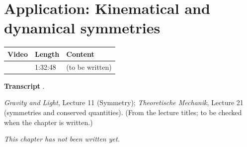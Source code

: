 \chapter{Application: Kinematical and dynamical symmetries}\label{ch:l28}
\begin{paracol}{2}

\begin{sources}
\begin{tabularx}{\linewidth}{@{}l l L@{}}
\toprule
\textbf{Video} & \textbf{Length} & \textbf{Content}\\
\midrule
{} & 1:32:48 & (to be written)\\
\bottomrule
\end{tabularx}

\smallskip
\textbf{Transcript} .
\end{sources}

\begin{reading}
\emph{Gravity and Light}, Lecture 11 (Symmetry); \emph{Theoretische Mechanik}, Lecture 21 (symmetries and conserved quantities). (From the lecture titles; to be checked when the chapter is written.)
\end{reading}

\emph{This chapter has not been written yet.}

\flushside
\end{paracol}
